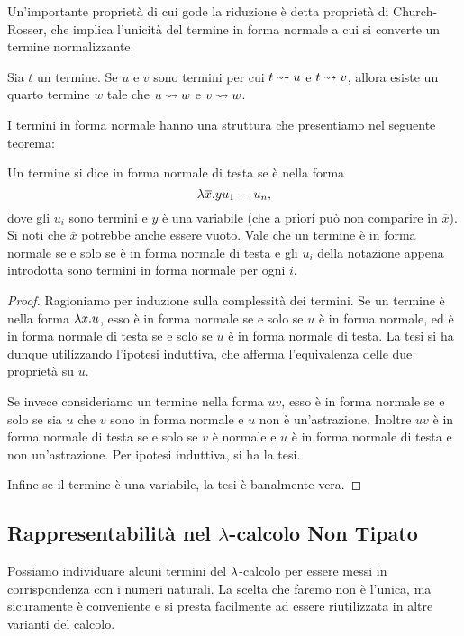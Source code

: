 \documentclass[]{marticle}
\begin{document}
Un'importante propriet\`a di cui gode la riduzione \`e detta propriet\`a di
Church-Rosser, che implica l'unicit\`a del termine in forma normale a cui si
converte un termine normalizzante.

\begin{block}[Teorema]
    Sia $t$ un termine. Se $u$ e $v$ sono termini per cui $t\rightsquigarrow u$ e $t\rightsquigarrow
    v$, allora esiste un quarto termine $w$ tale che $u\rightsquigarrow w$ e $v\rightsquigarrow w$.
\end{block}

I termini in forma normale hanno una struttura che presentiamo nel seguente
teorema:
\begin{block}[Proposizione]
    \label{head}
    Un termine si dice in forma normale di testa se \`e nella forma
    \[
        \lambda \overline{x}.yu_1\cdots u_n,
    \]
    dove gli $u_i$ sono termini e $y$ \`e una variabile (che a priori pu\`o non
    comparire in $\overline{x}$). Si noti che $\overline{x}$ potrebbe anche
    essere vuoto. Vale che un termine \`e in forma normale se e solo se \`e in
    forma normale di testa e gli $u_i$ della notazione appena introdotta sono
    termini in forma normale per ogni $i$.
\end{block}
\begin{proof}
    Ragioniamo per induzione sulla complessit\`a dei termini. Se un termine \`e
    nella forma $\lambda x.u$, esso \`e in forma normale se e solo se $u$ \`e in
    forma normale, ed \`e in forma normale di testa se e solo se $u$ \`e in
    forma normale di testa. La tesi si ha dunque utilizzando l'ipotesi
    induttiva, che afferma l'equivalenza delle due propriet\`a su $u$. 

    Se invece consideriamo un termine nella forma $uv$, esso \`e in forma
    normale se e solo se sia $u$ che $v$ sono in forma normale e $u$ non \`e
    un'astrazione. Inoltre $uv$ \`e in forma normale di testa se e solo se $v$
    \`e normale e $u$ \`e in forma normale di testa e non un'astrazione. Per
    ipotesi induttiva, si ha la tesi.

    Infine se il termine \`e una variabile, la tesi \`e banalmente vera.
\end{proof}

\subsection{Rappresentabilit\`a nel $\lambda$-calcolo Non Tipato}

Possiamo individuare alcuni termini del $\lambda$-calcolo per essere messi in
corrispondenza con i numeri naturali. La scelta che faremo non \`e l'unica, ma
sicuramente \`e conveniente e si presta facilmente ad essere riutilizzata in
altre varianti del calcolo.
\end{document}
